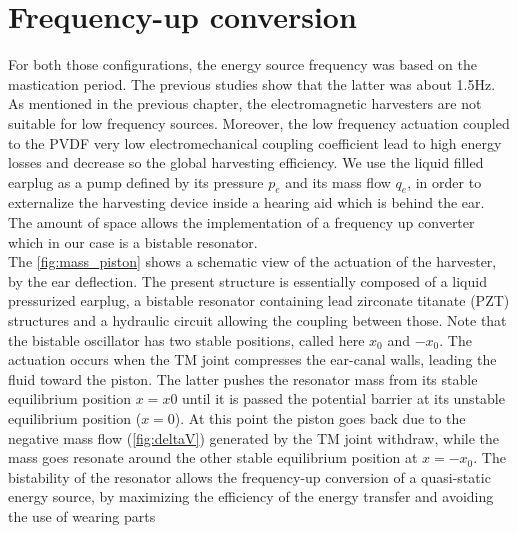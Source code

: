 \documentclass[3p,twocolumn,preprint]{elsarticle}
\begin{document}
\newpage
\section{Frequency-up conversion}

For both those configurations, the energy source frequency was based on the mastication period. The previous studies show that the latter was about 1.5Hz. As mentioned in the previous chapter, the electromagnetic harvesters are not suitable for low frequency sources. Moreover, the low frequency actuation coupled to the PVDF very low electromechanical coupling coefficient lead to high energy losses and decrease so the global harvesting efficiency.
We use the liquid filled earplug as a pump defined by its pressure $p_e$ and its mass flow $q_e$, in order to externalize the harvesting device inside a hearing aid which is behind the ear. The amount of space allows the implementation of a frequency up converter which in our case is a bistable resonator.\\
The \cref{fig:mass_piston} shows a schematic view of the actuation of the harvester, by the ear deflection. The present structure is essentially composed of a liquid pressurized earplug, a bistable resonator containing lead zirconate titanate (PZT) structures and a hydraulic circuit allowing the coupling between those. Note that the bistable oscillator has two stable positions, called here $x_0$ and $-x_0$. The actuation occurs when the TM joint compresses the ear-canal walls, leading the fluid toward the piston. The latter pushes the resonator mass from its stable equilibrium position $x=x0$ until it is passed the potential barrier at its unstable equilibrium position ($x=0$). At this point the piston goes back due to the negative mass flow (\cref{fig:deltaV}) generated by the TM joint withdraw, while the mass goes resonate around the other stable equilibrium position at $x=-x_0$. The bistability of the resonator allows the frequency-up conversion of a quasi-static energy source, by maximizing the efficiency of the energy transfer and avoiding the use of wearing parts
\end{document}
